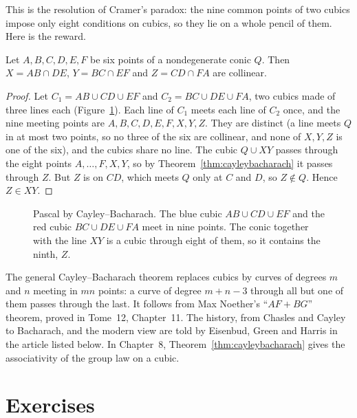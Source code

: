 This is the resolution of Cramer's paradox: the nine common points of two cubics impose only eight conditions on cubics, so they lie on a whole pencil of
them. Here is the reward.

\begin{corollary}\label{cor:pascalcb}
Let $A,B,C,D,E,F$ be six points of a nondegenerate conic $Q$. Then $X=AB\cap DE$, $Y=BC\cap EF$ and $Z=CD\cap FA$ are collinear.
\end{corollary}

\begin{proof}
Let $C_1=AB\cup CD\cup EF$ and $C_2=BC\cup DE\cup FA$, two cubics made of three lines each (Figure~\ref{fig:pascalcb}). Each line of $C_1$ meets each line of
$C_2$ once, and the nine meeting points are $A,B,C,D,E,F,X,Y,Z$. They are distinct (a line meets $Q$ in at most two points, so no three of the six are
collinear, and none of $X,Y,Z$ is one of the six), and the cubics share no line. The cubic $Q\cup XY$ passes through the eight points $A,\dots,F,X,Y$, so by
Theorem~\ref{thm:cayleybacharach} it passes through $Z$. But $Z$ is on $CD$, which meets $Q$ only at $C$ and $D$, so $Z\notin Q$. Hence $Z\in XY$.
\end{proof}

\begin{figure}[ht]
\centering
{}
\caption{Pascal by Cayley--Bacharach. The blue cubic $AB\cup CD\cup EF$ and the red cubic $BC\cup DE\cup FA$ meet in nine points. The conic together with the
line $XY$ is a cubic through eight of them, so it contains the ninth, $Z$.}
\label{fig:pascalcb}
\end{figure}

\begin{remark}
The general Cayley--Bacharach theorem replaces cubics by curves of degrees $m$ and $n$ meeting in $mn$ points: a curve of degree $m+n-3$ through all but one of
them passes through the last. It follows from Max Noether's ``$AF+BG$'' theorem, proved in Tome~12, Chapter~11. The history, from Chasles and Cayley to
Bacharach, and the modern view are told by Eisenbud, Green and Harris in the article listed below. In Chapter~8, Theorem~\ref{thm:cayleybacharach} gives the
associativity of the group law on a cubic.
\end{remark}

\section{Exercises}


